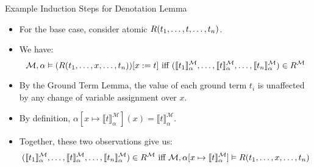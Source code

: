 \begin{frame}{Example Induction Steps for Denotation Lemma}

	\begin{itemize}%
	\itemsep=16pt

	\item For the base case, consider atomic $R(t_1, \mathellipsis, t, \mathellipsis, t_n)$.

	\item We have: 
         {\scriptsize \[\mathcal{M},\alpha\vDash (R(t_1, \mathellipsis,x, \mathellipsis, t_n))[x:=t]\text{ iff } (\llbracket t_1\rrbracket^\mathcal{M}_\alpha,\mathellipsis, \llbracket t\rrbracket^\mathcal{M}_\alpha,\mathellipsis,\llbracket t_n\rrbracket^\mathcal{M}_\alpha)\in R^\mathcal{M}\]}
         
         \vspace*{-24pt}

	\item By the Ground Term Lemma, the value of each ground term $t_i$ is unaffected by any change of variable assignment over $x$.

	\item By definition, $\alpha[x\mapsto \llbracket t\rrbracket^\mathcal{M}_\alpha](x)=\llbracket t\rrbracket^\mathcal{M}_\alpha$.

	\item Together, these two observations give us:
	{\scriptsize \[(\llbracket t_1\rrbracket^\mathcal{M}_\alpha,\mathellipsis, \llbracket t\rrbracket^\mathcal{M}_\alpha,\mathellipsis,\llbracket t_n\rrbracket^\mathcal{M}_\alpha)\in R^\mathcal{M} \text{ iff } \mathcal{M},\alpha[x\mapsto \llbracket t\rrbracket^\mathcal{M}_\alpha]\vDash R(t_1, \mathellipsis, x, \mathellipsis, t_n)\]}
               
         \vspace*{-24pt}
            
	\end{itemize}
  
\end{frame}

